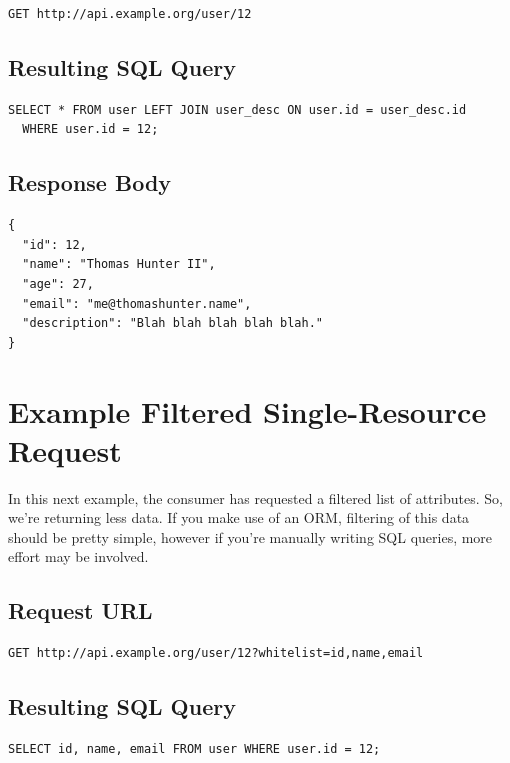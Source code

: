 \documentclass{book}
\begin{document}
\begin{verbatim}
GET http://api.example.org/user/12
\end{verbatim}

\subsection{Resulting SQL Query}

\begin{verbatim}
SELECT * FROM user LEFT JOIN user_desc ON user.id = user_desc.id
  WHERE user.id = 12;
\end{verbatim}

\subsection{Response Body}

\begin{verbatim}
{
  "id": 12,
  "name": "Thomas Hunter II",
  "age": 27,
  "email": "me@thomashunter.name",
  "description": "Blah blah blah blah blah."
}
\end{verbatim}

\section{Example Filtered Single-Resource Request}

In this next example, the consumer has requested a filtered list of attributes. So, we're returning less data. If you make use of an ORM, filtering of this data should be pretty simple, however if you're manually writing SQL queries, more effort may be involved.

\subsection{Request URL}

\begin{verbatim}
GET http://api.example.org/user/12?whitelist=id,name,email
\end{verbatim}

\subsection{Resulting SQL Query}

\begin{verbatim}
SELECT id, name, email FROM user WHERE user.id = 12;
\end{verbatim}
\end{document}
